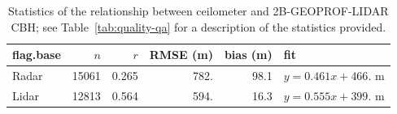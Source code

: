 \documentclass[essd,manuscript]{copernicus}\usepackage[]{graphicx}\usepackage[]{color}
\begin{document}
\begin{table}
  \caption{Statistics of the relationship between ceilometer and
    2B-GEOPROF-LIDAR CBH; see Table~\ref{tab:quality-qa} for a
    description of the statistics provided.}
  \label{tab:2bgeoprof}
  \centering
\begin{tabular}{lrrrrl}
  \hline
\hline
flag.base & $n$ & $r$ & RMSE (m) & bias (m) & fit \\ 
  \hline
Radar & 15061 & 0.265 & 782. & 98.1 & $y = 0.461 x + 466.$ m \\ 
  Lidar & 12813 & 0.564 & 594. & 16.3 & $y = 0.555 x + 399.$ m \\ 
   \hline
\hline
\end{tabular}

\end{table}
\end{document}
